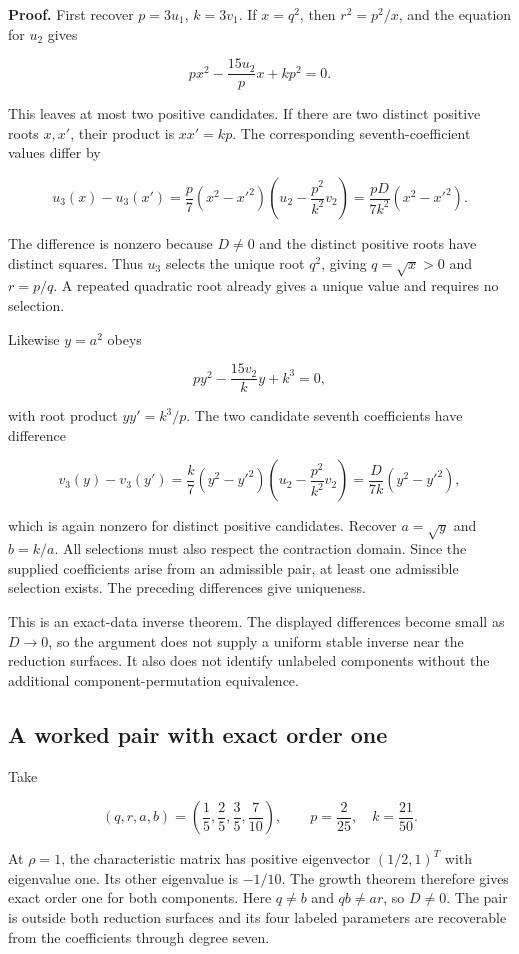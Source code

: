 \textbf{Proof.} First recover \(p=3u_1\), \(k=3v_1\). If \(x=q^2\), then
\(r^2=p^2/x\), and the equation for \(u_2\) gives

\[
p x^2-\frac{15u_2}{p}x+kp^2=0.
\]

This leaves at most two positive candidates. If there are two distinct
positive roots \(x,x'\), their product is \(xx'=kp\). The corresponding
seventh-coefficient values differ by

\[
u_3(x)-u_3(x')
=\frac p7(x^2-x'^2)
\left(u_2-\frac{p^2}{k^2}v_2\right)
=\frac{pD}{7k^2}(x^2-x'^2).
\]

The difference is nonzero because \(D\ne0\) and the distinct positive
roots have distinct squares. Thus \(u_3\) selects the unique root
\(q^2\), giving \(q=\sqrt{x}>0\) and \(r=p/q\). A repeated quadratic
root already gives a unique value and requires no selection.

Likewise \(y=a^2\) obeys

\[
p y^2-\frac{15v_2}{k}y+k^3=0,
\]

with root product \(yy'=k^3/p\). The two candidate seventh coefficients
have difference

\[
v_3(y)-v_3(y')
=\frac k7(y^2-y'^2)
\left(u_2-\frac{p^2}{k^2}v_2\right)
=\frac{D}{7k}(y^2-y'^2),
\]

which is again nonzero for distinct positive candidates. Recover
\(a=\sqrt{y}\) and \(b=k/a\). All selections must also respect the
contraction domain. Since the supplied coefficients arise from an
admissible pair, at least one admissible selection exists. The preceding
differences give uniqueness.

This is an exact-data inverse theorem. The displayed differences become
small as \(D\to0\), so the argument does not supply a uniform stable
inverse near the reduction surfaces. It also does not identify unlabeled
components without the additional component-permutation equivalence.

\hypertarget{v11-coupled_inverse_full-a-worked-pair-with-exact-order-one}{%
\subsection{A worked pair with exact order
one}\label{v11-coupled_inverse_full-a-worked-pair-with-exact-order-one}}

Take

\[
(q,r,a,b)=\left(\frac15,\frac25,\frac35,\frac7{10}\right),\qquad
p=\frac2{25},\quad k=\frac{21}{50}.
\]

At \(\rho=1\), the characteristic matrix has positive eigenvector
\((1/2,1)^T\) with eigenvalue one. Its other eigenvalue is \(-1/10\).
The growth theorem therefore gives exact order one for both components.
Here \(q\ne b\) and \(qb\ne ar\), so \(D\ne0\). The pair is outside both
reduction surfaces and its four labeled parameters are recoverable from
the coefficients through degree seven.

